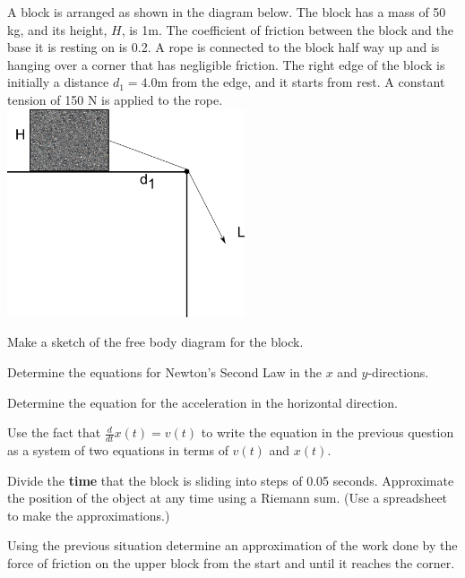 \begin{problem} 
\item A block is arranged as shown in the diagram below. The block has
  a mass of 50 kg, and its height, $H$, is 1m.  The coefficient of
  friction between the block and the base it is resting on is 0.2. A
  rope is connected to the block half way up and is hanging over a
  corner that has negligible friction. The right edge of the block is
  initially a distance $d_1=4.0$m from the edge, and it starts from
  rest. A constant tension of 150 N is applied to the rope. \\
  \includegraphics[width=7cm]{ink/week10/hangingBlocks}

  \begin{subproblem}
    \item Make a sketch of the free body diagram for the block.
      \vfill
    \item Determine the equations for Newton's Second Law in the $x$
      and $y$-directions.
      \vfill
      \clearpage
    \item Determine the equation for the acceleration in the
      horizontal direction.
      \vfill
    \item Use the fact that $\frac{d}{dt} x(t) = v(t)$ to write the
      equation in the previous question as a system of two equations
      in terms of $v(t)$ and $x(t)$.
      \vfill

      \clearpage

    \item Divide the \textbf{time} that the block is sliding into
      steps of 0.05 seconds. Approximate the position of the object at
      any time using a Riemann sum. (Use a spreadsheet to make the
      approximations.)

      \clearpage

  \end{subproblem}

  \clearpage

\item Using the previous situation determine an approximation of the
  work done by the force of friction on the upper block from the start
  and until it reaches the corner.

  \vfill

\end{problem}

